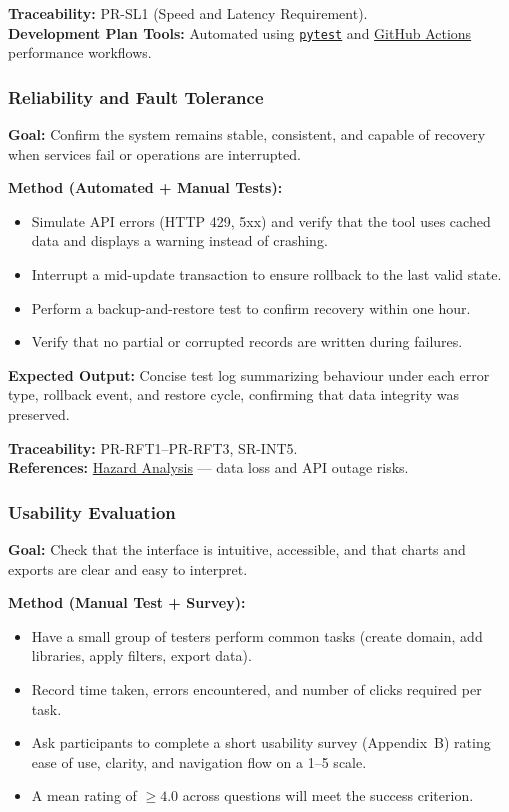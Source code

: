 \documentclass[12pt, titlepage]{article}
\begin{document}
\textbf{Traceability:} PR-SL1 (Speed and Latency Requirement).\\
\textbf{Development Plan Tools:} Automated using \texttt{\href{https://docs.pytest.org/en/stable/}{pytest}} and \href{https://github.com/thaafei/DomainX/actions}{GitHub Actions} performance workflows.

\subsubsection{Reliability and Fault Tolerance}
\label{subsubsec:reliability}

\textbf{Goal:} Confirm the system remains stable, consistent, and capable of recovery when services fail or operations are interrupted.

\textbf{Method (Automated + Manual Tests):}
\begin{itemize}
  \item Simulate API errors (HTTP 429, 5xx) and verify that the tool uses cached data and displays a warning instead of crashing.
  \item Interrupt a mid-update transaction to ensure rollback to the last valid state.
  \item Perform a backup-and-restore test to confirm recovery within one hour.
  \item Verify that no partial or corrupted records are written during failures.
\end{itemize}

\textbf{Expected Output:} Concise test log summarizing behaviour under each error type, rollback event, and restore cycle, confirming that data integrity was preserved.

\textbf{Traceability:} PR-RFT1--PR-RFT3, SR-INT5.\\
\textbf{References:} \href{https://github.com/thaafei/DomainX/blob/main/docs/HazardAnalysis/HazardAnalysis.pdf}{Hazard Analysis} --- data loss and API outage risks.

\subsubsection{Usability Evaluation}
\label{subsubsec:usability}

\textbf{Goal:} Check that the interface is intuitive, accessible, and that charts and exports are clear and easy to interpret.

\textbf{Method (Manual Test + Survey):}
\begin{itemize}
  \item Have a small group of testers perform common tasks (create domain, add libraries, apply filters, export data).
  \item Record time taken, errors encountered, and number of clicks required per task.
  \item Ask participants to complete a short usability survey (Appendix~B) rating ease of use, clarity, and navigation flow on a 1--5 scale.
  \item A mean rating of \(\ge 4.0\) across questions will meet the success criterion.
\end{itemize}
\end{document}
